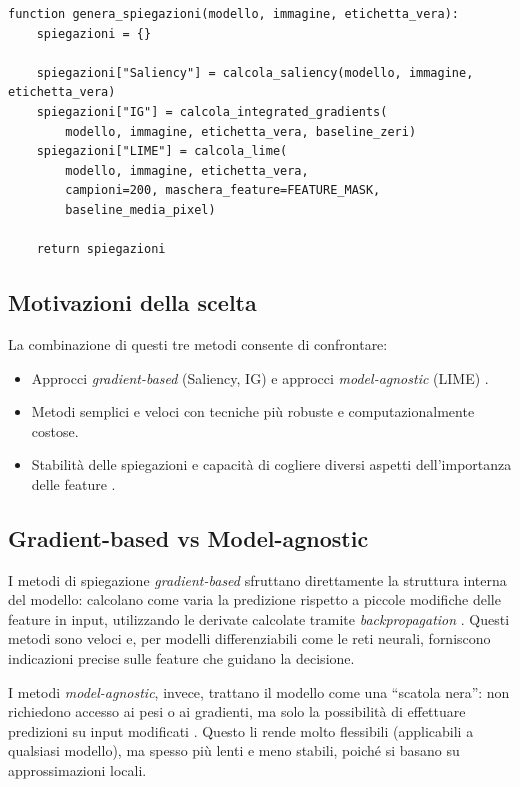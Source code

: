 \documentclass{article}
\begin{document}
\begin{lstlisting}[caption={Generazione delle spiegazioni}, label={lst:xai_generation}]
function genera_spiegazioni(modello, immagine, etichetta_vera):
    spiegazioni = {}
    
    spiegazioni["Saliency"] = calcola_saliency(modello, immagine, etichetta_vera)
    spiegazioni["IG"] = calcola_integrated_gradients(
        modello, immagine, etichetta_vera, baseline_zeri)
    spiegazioni["LIME"] = calcola_lime(
        modello, immagine, etichetta_vera,
        campioni=200, maschera_feature=FEATURE_MASK,
        baseline_media_pixel)
    
    return spiegazioni
\end{lstlisting}

\subsection{Motivazioni della scelta}
La combinazione di questi tre metodi consente di confrontare:
\begin{itemize}
      \item Approcci \emph{gradient-based} (Saliency, IG) e approcci \emph{model-agnostic}
            (LIME) \citep{simonyan2014deep,sundararajan2017axiomatic,ribeiro2016lime}.
      \item Metodi semplici e veloci con tecniche più robuste e computazionalmente costose.
      \item Stabilità delle spiegazioni e capacità di cogliere diversi aspetti
            dell’importanza delle feature \citep{samek2016evaluating,guidotti2018survey}.
\end{itemize}

\subsection{Gradient-based vs Model-agnostic}
I metodi di spiegazione \emph{gradient-based} sfruttano direttamente la
struttura interna del modello: calcolano come varia la predizione rispetto a
piccole modifiche delle feature in input, utilizzando le derivate calcolate
tramite \emph{backpropagation}
\citep{simonyan2014deep,sundararajan2017axiomatic}. Questi metodi sono veloci
e, per modelli differenziabili come le reti neurali, forniscono indicazioni
precise sulle feature che guidano la decisione.

I metodi \emph{model-agnostic}, invece, trattano il modello come una “scatola
nera”: non richiedono accesso ai pesi o ai gradienti, ma solo la possibilità di
effettuare predizioni su input modificati
\citep{ribeiro2016lime,guidotti2018survey}. Questo li rende molto flessibili
(applicabili a qualsiasi modello), ma spesso più lenti e meno stabili, poiché
si basano su approssimazioni locali.
\end{document}
